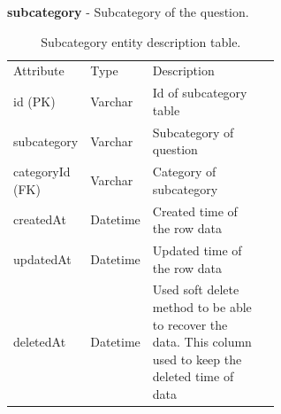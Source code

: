\documentclass[12pt,oneside,openright,a4paper]{cpe-english-project}
\begin{document}
\textbf{subcategory} - Subcategory of the question.
\begin{table}[ht]
	\caption{Subcategory entity description table.}
	\label{tab:Subcategory entity description table.}
\begin{adjustbox}{width=\textwidth}
\begin{tabular}{llp{0.6\linewidth}l}
\rowcolor[HTML]{5B9BD5} 
Attribute       & Type     & Description                                                                                                   \\
\rowcolor[HTML]{DEEAF6} 
id (PK)         & Varchar  & Id of subcategory table                                                                                       \\
subcategory     & Varchar  & Subcategory of question                                                                                       \\
\rowcolor[HTML]{DEEAF6} 
categoryId (FK) & Varchar  & Category of subcategory                                                                                       \\
createdAt       & Datetime & Created time of the row   data                                                                                \\
\rowcolor[HTML]{DEEAF6} 
updatedAt       & Datetime & Updated time of the row data                                                                                  \\
deletedAt       & Datetime & Used soft delete method   to be able to recover the data. This column used to keep the deleted time of   data
\end{tabular}
\end{adjustbox}
\end{table}
\end{document}
